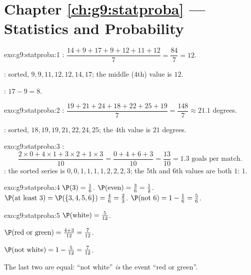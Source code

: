 \section*{Chapter \ref{ch:g9:statproba} --- Statistics and Probability}

\begin{solution}{exo:g9:statproba:1}
: $\dfrac{14 + 9 + 17 + 9 + 12 + 11 + 12}{7} = \dfrac{84}{7} = 12$.

: sorted, $9, 9, 11, 12, 12, 14, 17$; the middle ($4$th) value is
$12$.

: $17 - 9 = 8$.
\end{solution}

\begin{solution}{exo:g9:statproba:2}
: $\dfrac{19 + 21 + 24 + 18 + 22 + 25 + 19}{7} = \dfrac{148}{7}
\approx 21.1$ degrees.

: sorted, $18, 19, 19, 21, 22, 24, 25$; the $4$th value is $21$
degrees.
\end{solution}

\begin{solution}{exo:g9:statproba:3}
:
\[
\frac{2 \times 0 + 4 \times 1 + 3 \times 2 + 1 \times 3}{10}
= \frac{0 + 4 + 6 + 3}{10} = \frac{13}{10} = 1.3
\text{ goals per match.}
\]
: the sorted series is $0,0,1,1,1,1,2,2,2,3$; the $5$th and $6$th
values are both $1$:  $1$.
\end{solution}

\begin{solution}{exo:g9:statproba:4}
$\P(3) = \frac16$. \quad
$\P(\text{even}) = \frac36 = \frac12$. \quad
$\P(\text{at least } 3) = \P(\{3,4,5,6\}) = \frac46 = \frac23$. \quad
$\P(\text{not } 6) = 1 - \frac16 = \frac56$.
\end{solution}

\begin{solution}{exo:g9:statproba:5}
$\P(\text{white}) = \frac{5}{12}$.

$\P(\text{red or green}) = \frac{4 + 3}{12} = \frac{7}{12}$.

$\P(\text{not white}) = 1 - \frac{5}{12} = \frac{7}{12}$.

The last two are equal: ``not white'' \emph{is} the event ``red or
green''.
\end{solution}

